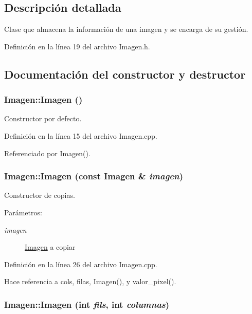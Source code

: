 \subsection{Descripción detallada}
Clase que almacena la información de una imagen y se encarga de su gestión. 

Definición en la línea 19 del archivo Imagen.h.

\subsection{Documentación del constructor y destructor}
\hypertarget{classImagen_b2e649aa7a105155c7bfdb846abf0528}{
\subsubsection[Imagen]{\setlength{\rightskip}{0pt plus 5cm}Imagen::Imagen ()}}
\label{classImagen_b2e649aa7a105155c7bfdb846abf0528}


Constructor por defecto. 



Definición en la línea 15 del archivo Imagen.cpp.

Referenciado por Imagen().\hypertarget{classImagen_88a2fe0c7fa0693b40190df137a0725a}{
\subsubsection[Imagen]{\setlength{\rightskip}{0pt plus 5cm}Imagen::Imagen (const {\bf Imagen} \& {\em imagen})}}
\label{classImagen_88a2fe0c7fa0693b40190df137a0725a}


Constructor de copias. 

\begin{Desc}
\item[Parámetros:]
\begin{description}
\item[{\em imagen}]\hyperlink{classImagen}{Imagen} a copiar \end{description}
\end{Desc}


Definición en la línea 26 del archivo Imagen.cpp.

Hace referencia a cols, filas, Imagen(), y valor\_\-pixel().\hypertarget{classImagen_36b8bfdc04ed34f7e342e96eb2943181}{
\subsubsection[Imagen]{\setlength{\rightskip}{0pt plus 5cm}Imagen::Imagen (int {\em fils}, \/  int {\em columnas})}}
\label{classImagen_36b8bfdc04ed34f7e342e96eb2943181}


